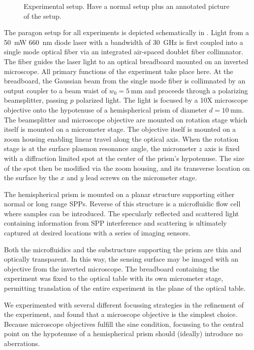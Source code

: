 \begin{figure}[ht]
 \centering
 \ersatzfigure
 \caption{Experimental setup. Have a normal setup plus an annotated picture
 of the setup.}
 \label{fig:experimentalsetup}
\end{figure}

The paragon setup for all experiments is depicted schematically in
.  Light from a \SI{50}{\milli\watt}
\SI{660}{\nano\meter} diode laser with a bandwidth of \SI{30}{\giga\hertz}
is first coupled into a single mode optical fiber via an integrated
air-spaced doublet fiber collimnator.  The fiber guides the laser light to
an optical breadboard mounted on an inverted microscope.  All primary
functions of the experiment take place here.  At the breadboard, the
Gaussian beam from the single mode fiber is collimnated by an output
coupler to a beam waist of $w_0=\SI{5}{\milli\meter}$ and proceeds through
a polarizing beamsplitter, passing $p$ polarized light.  The light is
focused by a 10X microscope objective onto the hypotenuse of a
hemispherical prism of diameter $d=\SI{10}{\milli\meter}$.  The
beamsplitter and microscope objective are mounted on rotation stage which
itself is mounted on a micrometer stage.  The objective itself is mounted
on a zoom housing enabling linear travel along the optical axis.  When the
rotation stage is at the surface plasmon resonance angle, the micrometer
$z$ axis is fixed with a diffraction limited spot at the center of the
prism's hypotenuse.  The size of the spot then be modified via the zoom
housing, and its transverse location on the surface by the $x$ and $y$ lead
screws on the micrometer stage.  

The hemispherical prism is mounted on a planar structure supporting either
normal or long range SPPs.  Reverse of this structure is a microfluidic
flow cell where samples can be introduced.  The specularly reflected and
scattered light containing information from SPP interference and scattering
is ultimately captured at desired locations with a series of imaging
sensors.

Both the microfluidics and the substructure supporting the prism are thin and
optically transparent.  In this way, the sensing surface may be imaged with
an objective from the inverted microscope.  The breadboard containing the
experiment was fixed to the optical table with its own micrometer stage,
permitting translation of the entire experiment in the plane of the optical
table.

We experimented with several different focussing strategies in the
refinement of the experiment, and found that a microscope objective is the
simplest choice.  Because microscope objectives fulfill the sine condition,
focussing to the central point on the hypotenuse of a hemispherical prism
should (ideally) introduce no aberrations.

